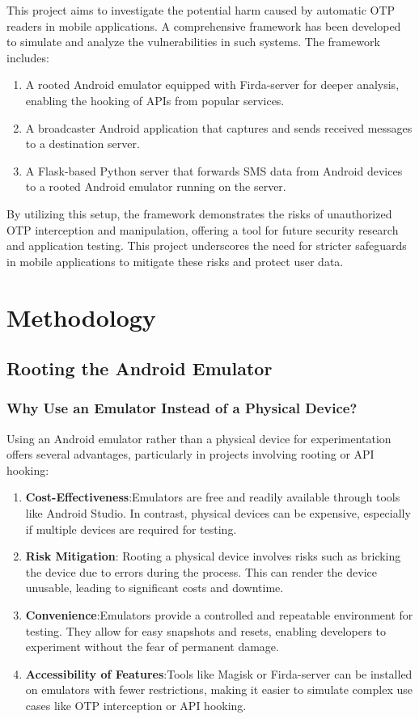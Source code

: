 \documentclass[a4paper,12pt]{article}
\begin{document}
This project aims to investigate the potential harm caused by automatic OTP readers in mobile applications. A comprehensive framework has been developed to simulate and analyze the vulnerabilities in such systems. The framework includes:

\begin{enumerate}
    \item A rooted Android emulator equipped with Firda-server for deeper analysis, enabling the hooking of APIs from popular services.
    \item A broadcaster Android application that captures and sends received messages to a destination server.
    \item A Flask-based Python server that forwards SMS data from Android devices to a rooted Android emulator running on the server.
\end{enumerate}

By utilizing this setup, the framework demonstrates the risks of unauthorized OTP interception and manipulation, offering a tool for future security research and application testing. This project underscores the need for stricter safeguards in mobile applications to mitigate these risks and protect user data.

\section{Methodology}
\subsection{Rooting the Android Emulator}
\subsubsection{Why Use an Emulator Instead of a Physical Device?}

Using an Android emulator rather than a physical device for experimentation offers several advantages, particularly in projects involving rooting or API hooking:

\begin{enumerate}
    \item \textbf{Cost-Effectiveness}:Emulators are free and readily available through tools like Android Studio. In contrast, physical devices can be expensive, especially if multiple devices are required for testing.
    \item \textbf{Risk Mitigation}: Rooting a physical device involves risks such as bricking the device due to errors during the process. This can render the device unusable, leading to significant costs and downtime.
    \item \textbf{Convenience}:Emulators provide a controlled and repeatable environment for testing. They allow for easy snapshots and resets, enabling developers to experiment without the fear of permanent damage.
    \item \textbf{Accessibility of Features}:Tools like Magisk or Firda-server can be installed on emulators with fewer restrictions, making it easier to simulate complex use cases like OTP interception or API hooking.
\end{enumerate}
\end{document}
